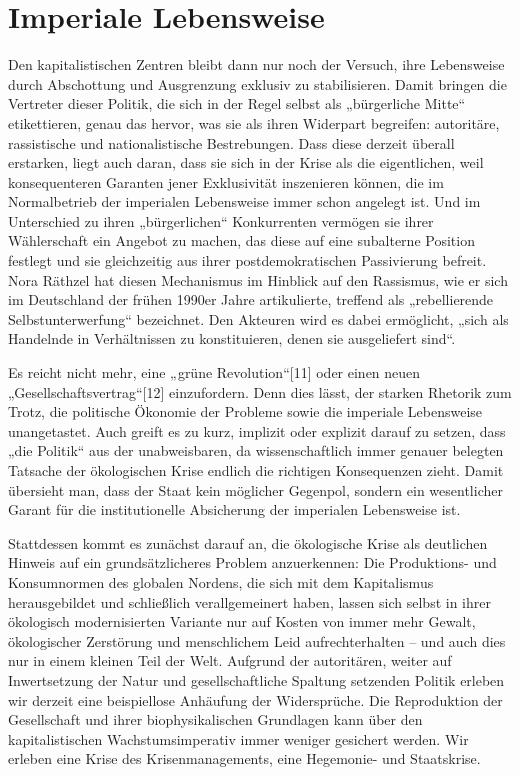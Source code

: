 \documentclass[
]{book}
\begin{document}
\hypertarget{imperiale-lebensweise}{%
\section{Imperiale Lebensweise}\label{imperiale-lebensweise}}

Den kapitalistischen Zentren bleibt dann nur noch der Versuch, ihre Lebensweise durch Abschottung und Ausgrenzung exklusiv zu stabilisieren. Damit bringen die Vertreter dieser Politik, die sich in der Regel selbst als „bürgerliche Mitte`` etikettieren, genau das hervor, was sie als ihren Widerpart begreifen: autoritäre, rassistische und nationalistische Bestrebungen. Dass diese derzeit überall erstarken, liegt auch daran, dass sie sich in der Krise als die eigentlichen, weil konsequenteren Garanten jener Exklusivität inszenieren können, die im Normalbetrieb der imperialen Lebensweise immer schon angelegt ist. Und im Unterschied zu ihren „bürgerlichen`` Konkurrenten vermögen sie ihrer Wählerschaft ein Angebot zu machen, das diese auf eine subalterne Position festlegt und sie gleichzeitig aus ihrer postdemokratischen Passivierung befreit. Nora Räthzel hat diesen Mechanismus im Hinblick auf den Rassismus, wie er sich im Deutschland der frühen 1990er Jahre artikulierte, treffend als „rebellierende Selbstunterwerfung`` bezeichnet. Den Akteuren wird es dabei ermöglicht, „sich als Handelnde in Verhältnissen zu konstituieren, denen sie ausgeliefert sind``.

Es reicht nicht mehr, eine „grüne Revolution``{[}11{]} oder einen neuen „Gesellschaftsvertrag``{[}12{]} einzufordern. Denn dies lässt, der starken Rhetorik zum Trotz, die politische Ökonomie der Probleme sowie die imperiale Lebensweise unangetastet. Auch greift es zu kurz, implizit oder explizit darauf zu setzen, dass „die Politik`` aus der unabweisbaren, da wissenschaftlich immer genauer belegten Tatsache der ökologischen Krise endlich die richtigen Konsequenzen zieht. Damit übersieht man, dass der Staat kein möglicher Gegenpol, sondern ein wesentlicher Garant für die institutionelle Absicherung der imperialen Lebensweise ist.

Stattdessen kommt es zunächst darauf an, die ökologische Krise als deutlichen Hinweis auf ein grundsätzlicheres Problem anzuerkennen: Die Produktions- und Konsumnormen des globalen Nordens, die sich mit dem Kapitalismus herausgebildet und schließlich verallgemeinert haben, lassen sich selbst in ihrer ökologisch modernisierten Variante nur auf Kosten von immer mehr Gewalt, ökologischer Zerstörung und menschlichem Leid aufrechterhalten -- und auch dies nur in einem kleinen Teil der Welt. Aufgrund der autoritären, weiter auf Inwertsetzung der Natur und gesellschaftliche Spaltung setzenden Politik erleben wir derzeit eine beispiellose Anhäufung der Widersprüche. Die Reproduktion der Gesellschaft und ihrer biophysikalischen Grundlagen kann über den kapitalistischen Wachstumsimperativ immer weniger gesichert werden. Wir erleben eine Krise des Krisenmanagements, eine Hegemonie- und Staatskrise.
\end{document}
